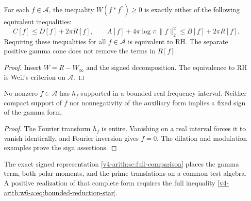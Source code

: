 \begin{theorem}
\label{v4-arith:w6-a:thm:bounded-reduction}
\label{v4-arith:w6-a:thm:irreducible-ATP}
For each $f\in\mathscr A$, the inequality $W(f*f^*)\ge0$ is
exactly either of the following equivalent inequalities:
\begin{equation}
 C[f]\le D[f]+2\pi R[f],\qquad
 A[f]+4\pi\log\pi\,\|f\|_2^2\le B[f]+2\pi R[f].
 \label{v4-arith:w6-a:eq:bounded-reduction-star}
\end{equation}
Requiring these inequalities for all $f\in\mathscr A$ is equivalent
to RH. The separate positive gamma cone does not remove the terms
in $R[f]$.
\end{theorem}
\begin{proof}
Insert $W=R-W_\infty$ and the signed decomposition.
The equivalence to RH is Weil's criterion on $\mathscr A$.
\end{proof}

\begin{proposition}
\label{v4-arith:w6-a:prop:rule-out-projection}
\label{v4-arith:w6-a:prop:rule-out-majorant}
\label{v4-arith:w6-a:prop:rule-out-pw-shrinkage}
No nonzero $f\in\mathscr A$ has $h_f$ supported in a bounded real
frequency interval. Neither compact support of $f$ nor nonnegativity
of the auxiliary form implies a fixed sign of the gamma form.
\end{proposition}
\begin{proof}
The Fourier transform $h_f$ is entire. Vanishing on a real interval
forces it to vanish identically, and Fourier inversion gives $f=0$.
The dilation and modulation examples prove the sign assertions.
\end{proof}

\begin{remark}
\label{v4-arith:w6-a:rem:live-constructions}
The exact signed representation
\eqref{v4-arith:sc:full-comparison} places the gamma term, both polar
moments, and the prime translations on a common test algebra.
A positive realization of that complete form requires the full
inequality \eqref{v4-arith:w6-a:eq:bounded-reduction-star}.
\end{remark}
